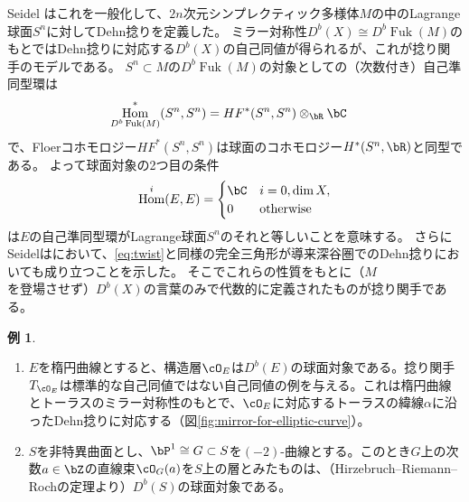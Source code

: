\documentclass[uplatex,11pt,a4paper,dvipdfmx]{jsarticle}
\numberwithin{equation}{section}
\numberwithin{figure}{section}
\theoremstyle{definition}
\newtheorem{example}[theorem]{例}
\DeclareMathOperator{\Hom}{\mathrm{Hom}}
\DeclareMathOperator{\Fuk}{Fuk}
\begin{document}
Seidel \cite{MR1743463}はこれを一般化して、$2n$次元シンプレクティック多様体$M$の中のLagrange球面$S^n$に対してDehn捻りを定義した。
ミラー対称性$D^b(X) \cong D^b \Fuk(M)$のもとではDehn捻りに対応する$D^b(X)$の自己同値が得られるが、これが捻り関手のモデルである。
$S^n \subset M$の$D^b\Fuk(M)$の対象としての（次数付き）自己準同型環は
\begin{align}
    \Hom_{D^b\Fuk(M)}^*(S^n, S^n) & = HF^*(S^n, S^n)\otimes_\bR \bC
\end{align}
で、Floerコホモロジー$HF^*(S^n, S^n)$は球面のコホモロジー$H^*(S^n, \bR)$と同型である。
よって球面対象の2つ目の条件
\begin{equation}
    \Hom^i(E, E) = \begin{cases}
        \bC & i = 0, \dim X,   \\
        0   & \text{otherwise}
    \end{cases}
\end{equation}
は$E$の自己準同型環がLagrange球面$S^n$のそれと等しいことを意味する。
さらにSeidelは\cite{MR1978046}において、\eqref{eq:twist}と同様の完全三角形が導来深谷圏でのDehn捻りにおいても成り立つことを示した。
そこでこれらの性質をもとに（$M$を登場させず）$D^b(X)$の言葉のみで代数的に定義されたものが捻り関手である。
\begin{example}
    \begin{enumerate}
        \item $E$を楕円曲線とすると、構造層$\cO_E$は$D^b(E)$の球面対象である。捻り関手$T_{\cO_E}$は標準的な自己同値ではない自己同値の例を与える。これは楕円曲線とトーラスのミラー対称性のもとで、$\cO_E$に対応するトーラスの緯線$\alpha$に沿ったDehn捻りに対応する（図\ref{fig:mirror-for-elliptic-curve}）。
        \item $S$を非特異曲面とし、$\bP^1 \cong G \subset S$を$(-2)$-曲線とする。このとき$G$上の次数$a \in \bZ$の直線束$\cO_G(a)$を$S$上の層とみたものは、（Hirzebruch--Riemann--Rochの定理より）$D^b(S)$の球面対象である。
    \end{enumerate}
\end{example}
\end{document}
